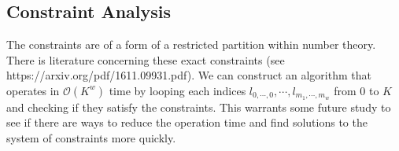 \subsection{Constraint Analysis}

The constraints are of a form of a restricted partition within number theory. There is literature concerning these exact constraints (see https://arxiv.org/pdf/1611.09931.pdf). We can construct an algorithm that operates in $\mathcal{O}(K^w)$ time by looping each indices $l_{0, \cdots, 0}, \cdots, l_{m_1, \cdots, m_w}$ from $0$ to $K$ and checking if they satisfy the constraints. This warrants some future study to see if there are ways to reduce the operation time and find solutions to the system of constraints more quickly.